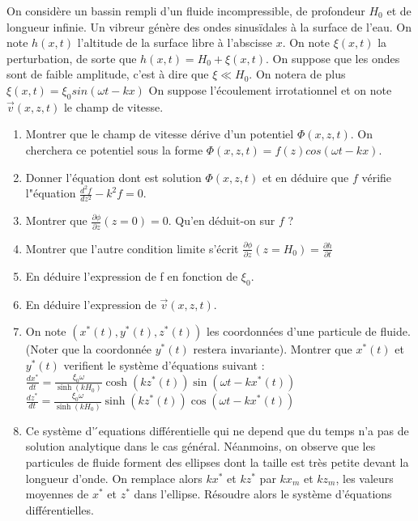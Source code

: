 \documentclass{article}
\begin{document}
On considère un bassin rempli d'un fluide incompressible, de profondeur $H_0$ et de longueur infinie.
Un vibreur génère des ondes sinusïdales à la surface de l'eau. 
On note $h(x,t)$ l'altitude de la surface libre à l'abscisse $x$. 
On note $\xi(x,t)$ la perturbation, de sorte que $h(x,t) = H_0 + \xi(x,t)$.
On suppose que les ondes sont de faible amplitude, c'est à dire que $\xi \ll H_0$.
On notera de plus $\xi(x,t)=\xi_0 sin(\omega t - kx)$
On suppose l'écoulement irrotationnel et on note $\vec{v}(x,z,t)$ le champ de vitesse.
\begin{enumerate}
    \item Montrer que le champ de vitesse dérive d'un potentiel $\Phi(x,z,t)$. 
    On cherchera ce potentiel sous la forme $\Phi(x,z,t)=f(z) cos(\omega t - kx)$.
    \item Donner l'équation dont est solution $\Phi(x,z,t)$ et en déduire que $f$ vérifie l"équation ${\frac{d^{2}f}{d z^{2}}}-k^{2}f=0$.
    \item Montrer que $\frac{\partial\phi}{\partial z}(z=0)=0$. Qu'en déduit-on sur $f$ ? 
    \item Montrer que l'autre condition limite s'écrit $\frac{\partial\phi}{\partial z}(z=H_{0})=\frac{\partial h}{\partial t}$
    \item En déduire l'expression de f en fonction de $\xi_0$. 
    \item En déduire l'expression de $\vec{v}(x,z,t)$.
    \item 
    
    On note $(x^*(t), y^*(t), z^*(t))$ les coordonnées d’une particule de fluide. (Noter que la coordonnée $y^*(t)$ restera invariante).
    Montrer que $x^*(t)$ et $ y^*(t)$  verifient le système d’équations suivant :\\[0.1cm]
    $\frac{d x^{*}}{d t}=\frac{\xi_{0}\omega}{\sinh(k H_{0})}\cosh(k z^{*}(t))\sin(\omega t-k x^{*}(t))$\\
    $\frac{d z^{*}}{d t}=\frac{\xi_{0}\omega}{\sinh(k H_{0})}\sinh(k z^{*}(t))\cos(\omega t-k x^{*}(t))$\\

    \item Ce système d’ ́equations différentielle qui ne depend que du temps n’a pas de solution analytique
    dans le cas général. Néanmoins, on observe que les particules de fluide forment des ellipses dont la taille est très petite devant la longueur d'onde.
   On remplace alors $kx^*$ et $kz^*$ par $kx_m$ et $kz_m$, les valeurs moyennes de $x^*$ et $z^*$ dans l'ellipse. 
   Résoudre alors le système d'équations différentielles.

\end{enumerate}
\end{document}
